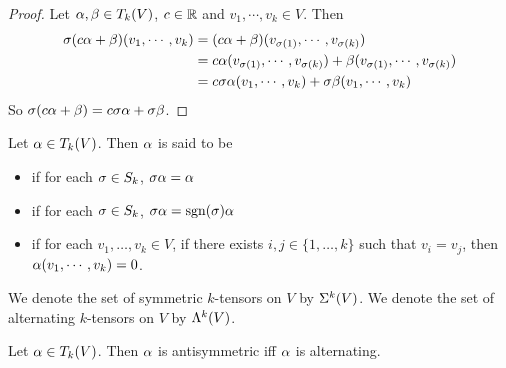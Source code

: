 \documentclass{book}
\begin{document}
	\begin{proof}
		Let $\alpha, \beta \in T_k(V)$, $c \in \mathbb{R}$ and $v_1, \cdots, v_k \in V$. Then 
		\begin{align*}
			\sigma(c\alpha + \beta)(v_1, \cdots, v_k) 
			&= (c\alpha + \beta)(v_{\sigma(1)}, \cdots, v_{\sigma(k)}) \\
			&= c \alpha(v_{\sigma(1)}, \cdots, v_{\sigma(k)}) + \beta(v_{\sigma(1)}, \cdots, v_{\sigma(k)}) \\
			&= c \sigma \alpha(v_1, \cdots, v_k) + \sigma \beta(v_1, \cdots, v_k)
		\end{align*}
		So $\sigma(c \alpha + \beta) = c\sigma \alpha + \sigma \beta$.
	\end{proof}
	
	\begin{defn}
		Let $\alpha \in T_k(V)$. Then $\alpha$ is said to be 
		\begin{itemize}
			\item {} if for each $\sigma \in S_k$, $\sigma \alpha = \alpha$
			\item {} if for each $\sigma \in S_k$, $\sigma \alpha = \operatorname{sgn}(\sigma) \alpha$
			\item {} if for each $v_1, \ldots, v_k \in V$, if there exists $i,j \in \{1, \ldots, k\}$ such that $v_i = v_j$, then $\alpha(v_1, \cdots, v_k) = 0$.
		\end{itemize}
	We denote the set of symmetric $k$-tensors on $V$ by $\Sigma^k(V)$. We denote the set of  alternating $k$-tensors on $V$ by $\Lambda^k(V)$.
	\end{defn}

	\begin{ex}
		Let $\alpha \in T_k(V)$. Then $\alpha$ is antisymmetric iff $\alpha$ is alternating.
	\end{ex}
\end{document}
